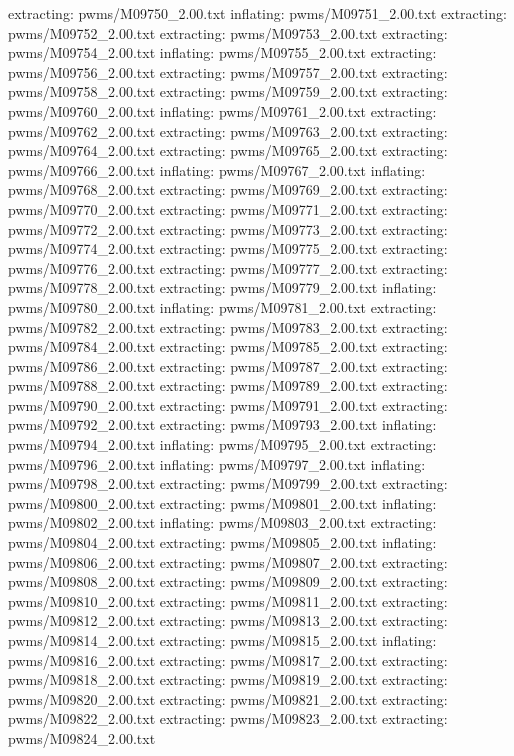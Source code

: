 \documentclass[letterpaper,10pt,english]{sphinxmanual}
\begin{document}
{\begin{sphinxVerbatim}[commandchars=\\\{\}]
 extracting: pwms/M09750\_2.00.txt
  inflating: pwms/M09751\_2.00.txt
 extracting: pwms/M09752\_2.00.txt
 extracting: pwms/M09753\_2.00.txt
 extracting: pwms/M09754\_2.00.txt
  inflating: pwms/M09755\_2.00.txt
 extracting: pwms/M09756\_2.00.txt
 extracting: pwms/M09757\_2.00.txt
 extracting: pwms/M09758\_2.00.txt
 extracting: pwms/M09759\_2.00.txt
 extracting: pwms/M09760\_2.00.txt
  inflating: pwms/M09761\_2.00.txt
 extracting: pwms/M09762\_2.00.txt
 extracting: pwms/M09763\_2.00.txt
 extracting: pwms/M09764\_2.00.txt
 extracting: pwms/M09765\_2.00.txt
 extracting: pwms/M09766\_2.00.txt
  inflating: pwms/M09767\_2.00.txt
  inflating: pwms/M09768\_2.00.txt
 extracting: pwms/M09769\_2.00.txt
 extracting: pwms/M09770\_2.00.txt
 extracting: pwms/M09771\_2.00.txt
 extracting: pwms/M09772\_2.00.txt
 extracting: pwms/M09773\_2.00.txt
 extracting: pwms/M09774\_2.00.txt
 extracting: pwms/M09775\_2.00.txt
 extracting: pwms/M09776\_2.00.txt
 extracting: pwms/M09777\_2.00.txt
 extracting: pwms/M09778\_2.00.txt
 extracting: pwms/M09779\_2.00.txt
  inflating: pwms/M09780\_2.00.txt
  inflating: pwms/M09781\_2.00.txt
 extracting: pwms/M09782\_2.00.txt
 extracting: pwms/M09783\_2.00.txt
 extracting: pwms/M09784\_2.00.txt
 extracting: pwms/M09785\_2.00.txt
 extracting: pwms/M09786\_2.00.txt
 extracting: pwms/M09787\_2.00.txt
 extracting: pwms/M09788\_2.00.txt
 extracting: pwms/M09789\_2.00.txt
 extracting: pwms/M09790\_2.00.txt
 extracting: pwms/M09791\_2.00.txt
 extracting: pwms/M09792\_2.00.txt
 extracting: pwms/M09793\_2.00.txt
  inflating: pwms/M09794\_2.00.txt
  inflating: pwms/M09795\_2.00.txt
 extracting: pwms/M09796\_2.00.txt
  inflating: pwms/M09797\_2.00.txt
  inflating: pwms/M09798\_2.00.txt
 extracting: pwms/M09799\_2.00.txt
 extracting: pwms/M09800\_2.00.txt
 extracting: pwms/M09801\_2.00.txt
  inflating: pwms/M09802\_2.00.txt
  inflating: pwms/M09803\_2.00.txt
 extracting: pwms/M09804\_2.00.txt
 extracting: pwms/M09805\_2.00.txt
  inflating: pwms/M09806\_2.00.txt
 extracting: pwms/M09807\_2.00.txt
 extracting: pwms/M09808\_2.00.txt
 extracting: pwms/M09809\_2.00.txt
 extracting: pwms/M09810\_2.00.txt
 extracting: pwms/M09811\_2.00.txt
 extracting: pwms/M09812\_2.00.txt
 extracting: pwms/M09813\_2.00.txt
 extracting: pwms/M09814\_2.00.txt
 extracting: pwms/M09815\_2.00.txt
  inflating: pwms/M09816\_2.00.txt
 extracting: pwms/M09817\_2.00.txt
 extracting: pwms/M09818\_2.00.txt
 extracting: pwms/M09819\_2.00.txt
 extracting: pwms/M09820\_2.00.txt
 extracting: pwms/M09821\_2.00.txt
 extracting: pwms/M09822\_2.00.txt
 extracting: pwms/M09823\_2.00.txt
 extracting: pwms/M09824\_2.00.txt

\end{sphinxVerbatim}}
\end{document}
